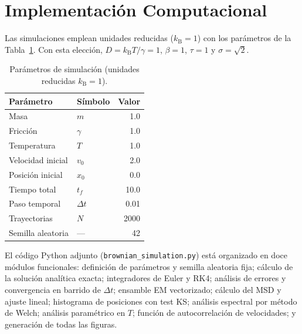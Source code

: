 \documentclass[aps,prl,twocolumn,showpacs,superscriptaddress,longbibliography]{revtex4-2}
\newcommand{\kB}{k_{\mathrm{B}}}
\newcommand{\dt}{\Delta t}
\begin{document}
	\section{Implementación Computacional}
	\label{sec:comp}
	
	Las simulaciones emplean unidades reducidas ($\kB=1$) con los
	parámetros de la Tabla~\ref{tab:param}.  Con esta elección,
	$D=\kB T/\gamma=1$, $\beta=1$, $\tau=1$ y $\sigma=\sqrt{2}$.
	
	\begin{table}[h]
		\centering
		\caption{Parámetros de simulación (unidades reducidas $\kB=1$).}
		\label{tab:param}
		\begin{ruledtabular}
			\begin{tabular}{llr}
				Parámetro          & Símbolo     & Valor \\
				\hline
				Masa               & $m$         & 1.0   \\
				Fricción           & $\gamma$    & 1.0   \\
				Temperatura        & $T$         & 1.0   \\
				Velocidad inicial  & $v_0$       & 2.0   \\
				Posición inicial   & $x_0$       & 0.0   \\
				Tiempo total       & $t_f$       & 10.0  \\
				Paso temporal      & $\dt$       & 0.01  \\
				Trayectorias       & $N$         & 2000  \\
				Semilla aleatoria  & —           & 42    \\
			\end{tabular}
		\end{ruledtabular}
	\end{table}
	
	El código Python adjunto (\texttt{brownian\_simulation.py}) está
	organizado en doce módulos funcionales: definición de parámetros y
	semilla aleatoria fija; cálculo de la solución analítica exacta;
	integradores de Euler y RK4; análisis de errores y convergencia en
	barrido de $\dt$; ensamble EM vectorizado; cálculo del MSD y ajuste
	lineal; histograma de posiciones con test KS; análisis espectral por
	método de Welch; análisis paramétrico en $T$; función de
	autocorrelación de velocidades; y generación de todas las figuras.
	
\end{document}
